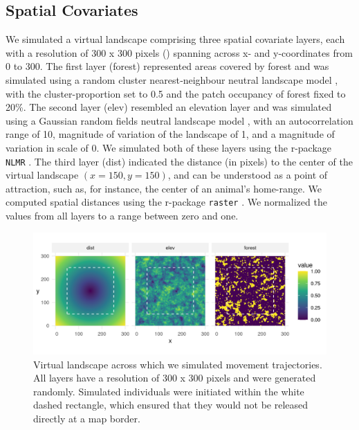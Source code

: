 \documentclass[abstract=on,10pt,a4paper,bibliography=totocnumbered]{article}
\begin{document}
\subsection{Spatial Covariates}
We simulated a virtual landscape comprising three spatial covariate layers, each
with a resolution of 300 x 300 pixels () spanning across x- and
y-coordinates from 0 to 300. The first layer (\textsf{forest}) represented areas
covered by forest and was simulated using a random cluster nearest‐neighbour
neutral landscape model \citep{Saura.2000}, with the cluster-proportion set to
0.5 and the patch occupancy of forest fixed to 20\%. The second layer
(\textsf{elev}) resembled an elevation layer and was simulated using a Gaussian
random fields neutral landscape model \citep{Schlather.2015}, with an
autocorrelation range of 10, magnitude of variation of the landscape of 1, and a
magnitude of variation in scale of 0. We simulated both of these layers using
the r-package {\tt NLMR} \citep{Sciaini.2018}. The third layer (\textsf{dist})
indicated the distance (in pixels) to the center of the virtual landscape \((x =
150, y = 150)\), and can be understood as a point of attraction, such as, for
instance, the center of an animal's home-range. We computed spatial distances
using the r-package {\tt raster} \citep{Hijmans.2022}. We normalized the values
from all layers to a range between zero and one.

\begin{figure}
  \begin{center}
  \includegraphics[width = \textwidth]{99_Covariates.png}
  \caption{Virtual landscape across which we simulated movement trajectories.
  All layers have a resolution of 300 x 300 pixels and were generated randomly.
  Simulated individuals were initiated within the white dashed rectangle, which
  ensured that they would not be released directly at a map border.}
  \label{Covariates}
  \end{center}
\end{figure}
\end{document}
